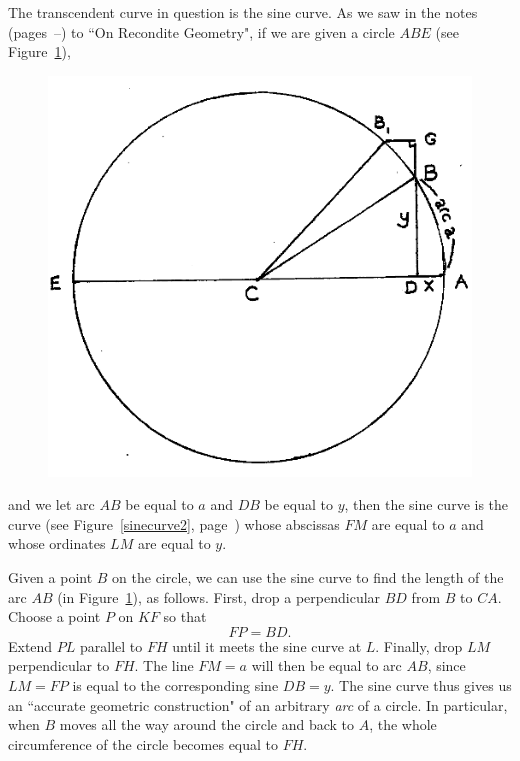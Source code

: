 \documentclass[polutonikogreek,english,twoside,openright]{article}
\begin{document}
The transcendent curve in question is the sine curve.  As we saw in
the notes (pages~\pageref{begsin}--\pageref{endsin}) to ``On Recondite
Geometry", if we are given a circle $ABE$ (see Figure~\ref{circarc4}),
\begin{figure}[htp]
  \begin{center}
    \includegraphics[width=.65\textwidth]{fig/Figure42}
    \caption{}
    \label{circarc4}
    \vspace{-10pt}
  \end{center}
\end{figure} and we let arc $AB$ be equal to $a$ and $DB$ be equal to
$y$, then the sine curve is the curve (see Figure~\ref{sinecurve2},
page~\pageref{sinecurve2}) whose abscissas $FM$ are equal to $a$ and
whose ordinates $LM$ are equal to $y$.

Given a point $B$ on the circle, we can use the sine curve to find the
length of the arc $AB$ (in Figure~\ref{circarc4}), as follows. First,
drop a perpendicular $BD$ from $B$ to $CA$.  Choose a point $P$ on
$KF$ so that
$$FP = BD.$$
Extend $PL$ parallel to $FH$ until it meets the sine curve at $L$.
Finally, drop $LM$ perpendicular to $FH$. The line $FM=a$ will then be
equal to arc $AB$, since $LM = FP$ is equal to the corresponding sine
$DB= y$.  The sine curve thus gives us an ``accurate geometric
construction" of an arbitrary {\em arc} of a circle.  In particular,
when $B$ moves all the way around the circle and back to $A$, the
whole circumference of the circle becomes equal to $FH$.
\end{document}
